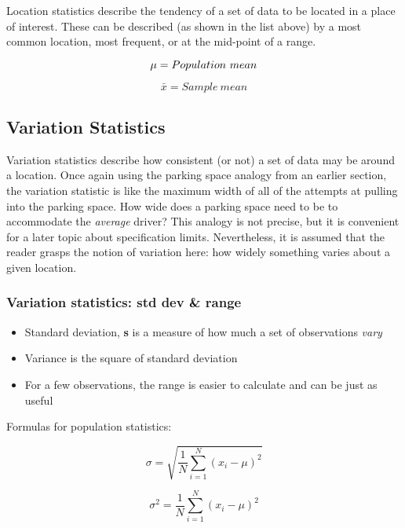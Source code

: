 Location statistics  describe the tendency of a set of data to be located in a place of interest.  These can be described (as shown in the list above) by a most common location, most frequent, or at the mid-point of a range.


\begin{equation} \mu \index{mean} = Population \  mean\end{equation}

\begin{equation} \bar{x} =  Sample \  mean\end{equation}


\subsection{Variation Statistics} 

Variation statistics describe how consistent (or not) a set of data may be around a location.  Once again using the parking space analogy from an earlier section, the variation statistic is like the maximum width of all of the attempts at pulling into the parking space.  How wide does a parking space need to be to accommodate the \textsl{average} driver?  This analogy is not precise, but it is convenient for a later topic about specification limits.  Nevertheless, it is assumed that the reader grasps the notion of variation here: how widely something varies about a given location.

\subsubsection{Variation statistics: std dev \& range}
   
  \begin{itemize}
  \item Standard deviation, \textbf{s}   is a measure of how much a set of observations \textsl{vary}
  \item Variance is the square of standard deviation
  \item For a few observations, the range is easier to calculate and can be just as useful
  \end{itemize}
  
  
Formulas for population statistics:

\begin{center}
\begin{equation}
\sigma = \sqrt{\frac{1}{N}\displaystyle\sum_{i=1}^{N}{\left( x_{i}-\mu\right)}^2 }
\end{equation}

\begin{equation}
\sigma^{2} = {\frac{1}{N}\displaystyle\sum_{i=1}^{N}{\left( x_{i}-\mu\right)}^2 }
\end{equation}
\end{center}

